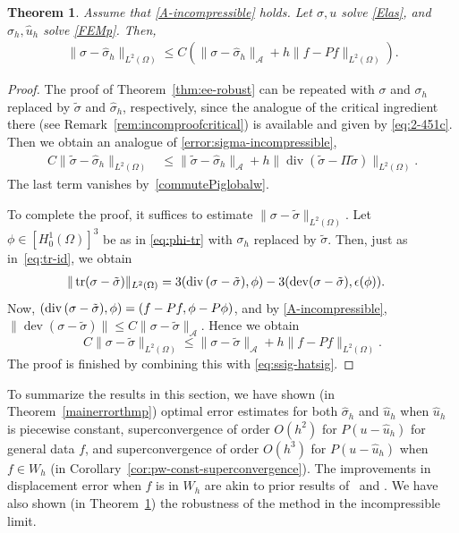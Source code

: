 \documentclass[12pt]{amsart}
\numberwithin{equation}{section}
\DeclareMathOperator{\dev}{dev}
\newtheorem{theorem}{Theorem}[section]
\theoremstyle{definition}
\theoremstyle{remark}
\newcommand{\om}{{\Omega}}
\renewcommand{\(}{\bigl(}
\renewcommand{\)}{\bigr)}
\renewcommand\div{\operatorname{div}}
\newcommand\tr{\operatorname{tr}}
\newcommand{\uu}{\hat{u}}  %
\newcommand{\ssigma}{\hat{\sigma}}   %
\newcommand{\tsigma}{\tilde{\sigma}}
\newcommand{\tu}{\tilde{u}}
\newcommand{\dive}{{\ensuremath\mathop{\mathrm{div}\,}}} %
\newcommand{\Aa}{\mathcal{A}}
\newcommand{\revj}[1]{{\color{black}#1}}
\begin{document}
\begin{theorem}
  \label{thm:const-displ-incomp}
    Assume that \eqref{A-incompressible} \revj{holds}. Let $\sigma, u$ solve \eqref{Elas}, and $\ssigma_h, \uu_h$ solve \eqref{FEMp}. Then, 
    \begin{align*}
      \|\sigma-\ssigma_h\|_{L^2(\Omega)} \le C ( \|\sigma-\ssigma_h\|_{\Aa}
      + h %
       \|f  - P f \|_{L^2(\Omega)}).
    \end{align*}
\end{theorem}
\begin{proof}
  The proof of Theorem~\ref{thm:ee-robust}
  can be repeated with $\sigma$ and $\sigma_h$ replaced by $\tsigma$ and
  $\ssigma_h$, respectively, since the analogue of the critical
  ingredient there (see Remark~\ref{rem:incomproofcritical}) is available
  and given by \eqref{eq:2-451c}. Then we obtain an
  analogue of \eqref{error:sigma-incompressible}, 
  \begin{align}
    \label{eq:ssig-hatsig}
    C \|\tsigma-\ssigma_h\|_{L^2(\Omega)}
    & \le  \|\tsigma-\ssigma_h\|_{\Aa} +
      h \|\div (\tsigma - \Pi \tsigma) \|_{L^2(\Omega)}.
  \end{align}
  The last term vanishes by~\eqref{commutePiglobalw}.


  To complete the proof,  it suffices to estimate $\| \sigma - \tsigma\|_{L^2(\om)}$. 
  Let $\phi \in [H_0^1(\Omega)]^3$ 
  be as in  \eqref{eq:phi-tr} with $\sigma_h$ replaced by $\tsigma$.
  Then, just as in~\eqref{eq:tr-id}, we obtain
  \begin{align*}
    \| \tr(\sigma - \tsigma) \|_{L^2(\om)}
    & 
      = 3 (\dive( \sigma - \tsigma), \phi) -
      3 (\dev(\sigma - \tsigma), \epsilon(\phi)).
  \end{align*}
  Now, $(\dive( \sigma - \tsigma), \phi) = (f - Pf, \phi - P\phi)$,
  and by  \eqref{A-incompressible},  $ \| \dev(\sigma - \tsigma) \| \le C \| \sigma - \tsigma \|_{\Aa}$. Hence we obtain
  \[
    C \| \sigma - \tsigma \|_{L^2(\om)} \le  \| \sigma - \tsigma\|_{\Aa}
    + h\| f - Pf \|_{L^2(\om)}.
  \]
  The proof is finished by combining this with \eqref{eq:ssig-hatsig}.
\end{proof}



To summarize the results in this section, 
we have shown (in Theorem~\ref{mainerrorthmp}) optimal error estimates for both
$\ssigma_h$ and $\uu_h$ when $\uu_h$ is piecewise constant,
superconvergence of order $O(h^2)$ for $P(u - \uu_h)$ for general data
$f$, and superconvergence of order $O(h^3)$ for $P(u - \uu_h)$ when
$f \in W_h$ (in Corollary~\ref{cor:pw-const-superconvergence}).
\revj{The improvements in displacement error when $f$ is in $W_h$
  are akin to prior results of~\cite[Theorem~4.1]{stenberg1988elasticity} and
\cite[Theorem~2.1]{stenberg1991postprocessing}.}
We
have also shown (in Theorem~\ref{thm:const-displ-incomp}) the robustness of the method in the incompressible limit.
\end{document}
